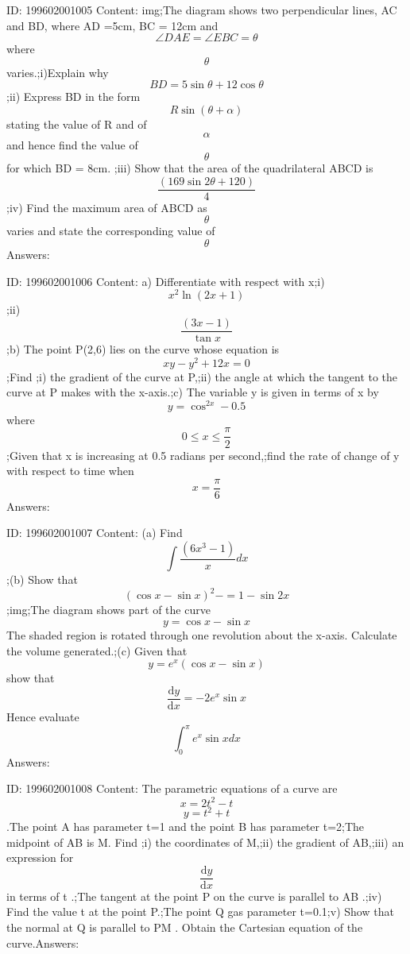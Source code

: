\documentclass{article}
\begin{document}
ID: 199602001005
Content:
img;The diagram shows two perpendicular lines, AC and BD, where AD =5cm, BC = 12cm and \[\angle DAE = \angle EBC = \theta\] where \[\theta\]  varies.;i)Explain why \[BD= 5\sin \theta + 12\cos \theta\] ;ii) Express BD in the form \[R\sin(\theta + \alpha)\] stating the value of R and of \[\alpha\]  and hence find the value of \[\theta\]   for which BD = 8cm. ;iii) Show that the area of the quadrilateral ABCD is \[\frac{(169\sin 2\theta + 120)}{4}\];iv) Find the maximum area of ABCD as \[\theta\]   varies and state the corresponding value of \[\theta\]  Answers:

ID: 199602001006
Content:
a) Differentiate with respect with x;i) \[x^2\ln(2x+1)\] ;ii) \[\frac{(3x-1)}{\tan x}\] ;b) The point P(2,6) lies on the curve whose equation is \[xy-y^2+12x=0\];Find ;i) the gradient of the curve at P,;ii) the angle at which the tangent to the curve at P makes with the x-axis.;c) The variable y is given in terms of x by \[y=\cos^{2x}-0.5\] where \[0\leq x\leq \frac{\pi }{2}\];Given that x is increasing at 0.5 radians per second,;find the rate of change of y with respect to time when \[x=\frac{\pi }{6}\]Answers:

ID: 199602001007
Content:
(a)	  Find \[\int\frac{(6x^3-1)}{x} dx\];(b)	Show that\[(\cos x-\sin x)^2-=1-\sin 2x\];img;The diagram shows part of the curve \[y= \cos x-\sin x\] The shaded region is rotated through one revolution about the x-axis. Calculate the volume generated.;(c)	Given that \[y=e^x(\cos x-\sin x)\] show that \[\frac{\mathrm{d} y}{\mathrm{d} x}=-2e^x\sin x\] Hence evaluate \[\int_0^\pi  e^x \sin x dx\]Answers:

ID: 199602001008
Content:
The parametric equations of a curve are \[x=2t^2-t\] \[y=t^2+t\].The point A has parameter t=1 and the point B has parameter t=2;The midpoint of AB is M. Find ;i) the coordinates of M,;ii) the gradient of AB,;iii) an expression for \[\frac{\mathrm{d} y}{\mathrm{d} x}\] in terms of t .;The tangent at the point P on the curve is parallel to AB .;iv) Find the value t at the point P.;The point Q gas parameter t=0.1;v) Show that the normal at Q is parallel to PM . Obtain the Cartesian equation of the curve.Answers:
\end{document}
